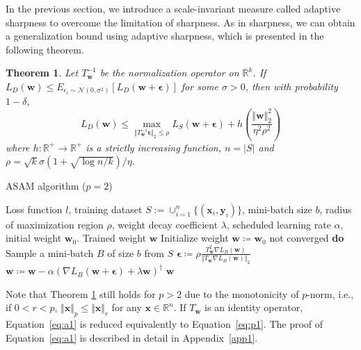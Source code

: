 \documentclass{article}
\newcommand{\mf}[1]{\mathbf{#1}}
\newtheorem{thm}{Theorem}
\begin{document}
In the previous section, we introduce a scale-invariant measure called adaptive sharpness to overcome the limitation of sharpness.
As in sharpness, we can obtain a generalization bound using adaptive sharpness, which is presented in the following theorem.
\begin{thm}\label{thm2}
Let $T^{-1}_\mf{w}$ be the normalization operator on $\mathbb{R}^k$.
If $L_D(\mf w) \leq E_{\epsilon_i \sim \mathcal{N}(0, \sigma^2)} [L_D(\mf w+\bm\epsilon)]$ for some $\sigma > 0$,
then with probability $1-\delta$, 
\begin{equation} \label{eq:a1}
L_{D}(\mf{w}) \leq \max_{\Vert T^{-1}_\mf{w} \bm{\epsilon}\Vert _{2} \leq \rho } L_{S}(\mf{w}+\bm{\epsilon}) + h\left(\frac{\Vert \mf{w}\Vert _{2}^2}{\eta^2 \rho^2}\right)
\end{equation}
where $h: \mathbb{R}^+ \rightarrow \mathbb{R}^+$ is a strictly increasing function, $n = \vert S\vert$ and $\rho = \sqrt{k}\sigma (1+\sqrt{\log n / k}) /\eta$.
\end{thm}


\begin{algorithm}[tb]
   \caption{ASAM algorithm ($p=2$)}
   \label{alg1}
\begin{algorithmic}
    Loss function $l$, training dataset $S:=\cup^n_{i=1}\{(\mf{x}_i, \mf{y}_i)\}$, mini-batch size $b$, radius of maximization region $\rho$, weight decay coefficient $\lambda$, scheduled learning rate $\alpha$, initial weight $\mf{w}_0$.
    Trained weight $\mf{w}$
   \STATE Initialize weight $\mf{w} \coloneqq \mf{w}_0$
    not converged  {\bfseries do} 
   \STATE   \hspace{0.05\linewidth} Sample a mini-batch $B$ of size $b$ from $S$
   \STATE   \hspace{0.05\linewidth} $\bm{\epsilon} \coloneqq \rho \frac {\displaystyle T^2_{\mf{w}} \nabla L_B(\mf{w})} {\displaystyle \Vert T_{\mf{w}} \nabla L_B(\mf{w}) \Vert_2}$
   \STATE   \hspace{0.05\linewidth} $\mf{w} \coloneqq \mf{w} - \alpha \left( \nabla L_B(\mf{w} + \bm{\epsilon}) + \lambda \mf{w} \right)^{\dagger}$
    $\mf{w}$
\end{algorithmic}
\end{algorithm}


Note that Theorem \ref{thm2} still holds for $p > 2$ due to the monotonicity of $p$-norm, i.e.,
if $0<r<p$, $\Vert\mf{x}\Vert_p \leq \Vert\mf{x}\Vert_r$ for any $\mf{x}\in\mathbb{R}^n$.
If $T_\mf{w}$ is an identity operator, Equation~\ref{eq:a1} is reduced equivalently to Equation~\ref{eq:p1}.
The proof of Equation~\ref{eq:a1} is described in detail in Appendix~\ref{app1}. 
\end{document}
